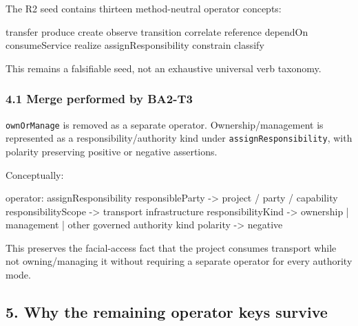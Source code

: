 \documentclass[
  10pt,
  a4paper,
]{article}
\newenvironment{Shaded}{}{}
\newcommand{\NormalTok}[1]{#1}
\begin{document}
The R2 seed contains thirteen method-neutral operator concepts:

\begin{Shaded}
\begin{Highlighting}[]
\NormalTok{transfer}
\NormalTok{produce}
\NormalTok{create}
\NormalTok{observe}
\NormalTok{transition}
\NormalTok{correlate}
\NormalTok{reference}
\NormalTok{dependOn}
\NormalTok{consumeService}
\NormalTok{realize}
\NormalTok{assignResponsibility}
\NormalTok{constrain}
\NormalTok{classify}
\end{Highlighting}
\end{Shaded}

This remains a falsifiable seed, not an exhaustive universal verb
taxonomy.

\subsubsection{4.1 Merge performed by
BA2-T3}\label{41-merge-performed-by-ba2-t3}

\texttt{ownOrManage} is removed as a separate operator.
Ownership/management is represented as a responsibility/authority kind
under \texttt{assignResponsibility}, with polarity preserving positive
or negative assertions.

Conceptually:

\begin{Shaded}
\begin{Highlighting}[]
\NormalTok{operator: assignResponsibility}
\NormalTok{responsibleParty  {-}\textgreater{} project / party / capability}
\NormalTok{responsibilityScope {-}\textgreater{} transport infrastructure}
\NormalTok{responsibilityKind  {-}\textgreater{} ownership | management | other governed authority kind}
\NormalTok{polarity            {-}\textgreater{} negative}
\end{Highlighting}
\end{Shaded}

This preserves the facial-access fact that the project consumes
transport while not owning/managing it without requiring a separate
operator for every authority mode.

\subsection{5. Why the remaining operator keys
survive}\label{5-why-the-remaining-operator-keys-survive}
\end{document}
